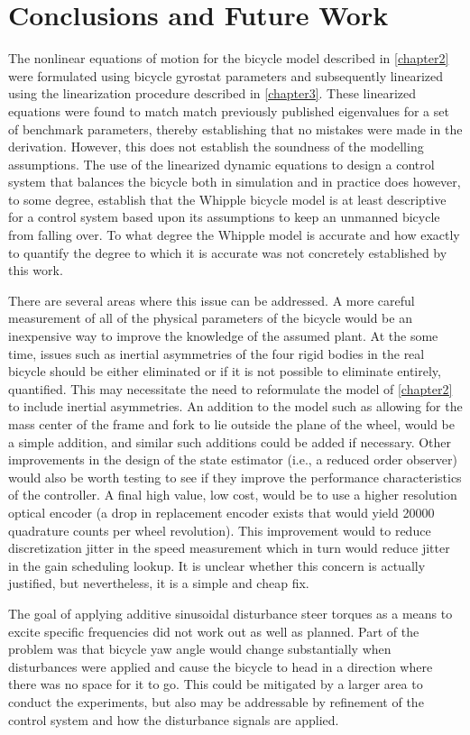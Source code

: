 \chapter{Conclusions and Future Work}
The nonlinear equations of motion for the bicycle model described in
\autoref{chapter2} were formulated using bicycle gyrostat parameters and
subsequently linearized using the linearization procedure described in
\autoref{chapter3}. These linearized equations were found to match  match
previously published eigenvalues for a set of benchmark parameters, thereby
establishing that no mistakes were made in the derivation. However, this does
not establish the soundness of the modelling assumptions. The use of the
linearized dynamic equations to design a control system that balances the
bicycle both in simulation and in practice does however, to some degree,
establish that the Whipple bicycle model is at least descriptive for a control
system based upon its assumptions to keep an unmanned bicycle from falling
over. To what degree the Whipple model is accurate and how exactly to quantify
the degree to which it is accurate was not concretely established by this work.

There are several areas where this issue can be addressed. A more careful
measurement of all of the physical parameters of the bicycle would be an
inexpensive way to improve the knowledge of the assumed plant. At the some
time, issues such as inertial asymmetries of the four rigid bodies in the real
bicycle should be either eliminated or if it is not possible to eliminate
entirely, quantified. This may necessitate the need to reformulate the model of
\autoref{chapter2} to include inertial asymmetries. An addition to the model
such as allowing for the mass center of the frame and fork to lie outside the
plane of the wheel, would be a simple addition, and similar such additions
could be added if necessary. Other improvements in the design of the state
estimator (i.e., a reduced order observer) would also be worth testing to see
if they improve the performance characteristics of the controller. A final high
value, low cost, would be to use a higher resolution optical encoder (a drop in
replacement encoder exists that would yield 20000 quadrature counts per wheel
revolution). This improvement would to reduce discretization jitter in the
speed measurement which in turn would reduce jitter in the gain scheduling
lookup. It is unclear whether this concern is actually justified, but
nevertheless, it is a simple and cheap fix.

The goal of applying additive sinusoidal disturbance steer torques as a means
to excite specific frequencies did not work out as well as planned.  Part of
the problem was that bicycle yaw angle would change substantially when
disturbances were applied and cause the bicycle to head in a direction where
there was no space for it to go. This could be mitigated by a larger area to
conduct the experiments, but also may be addressable by refinement of the
control system and how the disturbance signals are applied.

